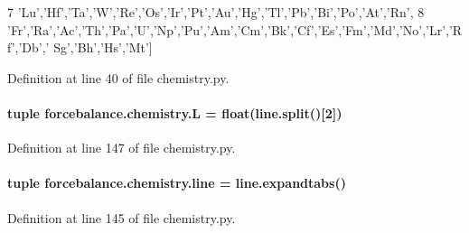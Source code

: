 \begin{DoxyCode}
7             \textcolor{stringliteral}{'Lu'},\textcolor{stringliteral}{'Hf'},\textcolor{stringliteral}{'Ta'},\textcolor{stringliteral}{'W'},\textcolor{stringliteral}{'Re'},\textcolor{stringliteral}{'Os'},\textcolor{stringliteral}{'Ir'},\textcolor{stringliteral}{'Pt'},\textcolor{stringliteral}{'Au'},\textcolor{stringliteral}{'Hg'},\textcolor{stringliteral}{'Tl'},\textcolor{stringliteral}{'Pb'},\textcolor{stringliteral}{'Bi'},\textcolor{stringliteral}{'Po'},\textcolor{stringliteral}{'At'},\textcolor{stringliteral}{'Rn'},
8             \textcolor{stringliteral}{'Fr'},\textcolor{stringliteral}{'Ra'},\textcolor{stringliteral}{'Ac'},\textcolor{stringliteral}{'Th'},\textcolor{stringliteral}{'Pa'},\textcolor{stringliteral}{'}\textcolor{stringliteral}{U','}Np','Pu','Am','Cm','Bk','Cf','Es','Fm','Md','No','Lr','Rf','Db','
      Sg','Bh','Hs','Mt']
\end{DoxyCode}


Definition at line 40 of file chemistry.\-py.

\hypertarget{namespaceforcebalance_1_1chemistry_ad5838ecc45d68a3a29f0c2518ceaaca2}{
\paragraph[{L}]{\setlength{\rightskip}{0pt plus 5cm}tuple forcebalance.\-chemistry.\-L = float(line.\-split()\mbox{[}2\mbox{]})}}\label{namespaceforcebalance_1_1chemistry_ad5838ecc45d68a3a29f0c2518ceaaca2}


Definition at line 147 of file chemistry.\-py.

\hypertarget{namespaceforcebalance_1_1chemistry_a5a3b715a402d39a5da6ae558e400ce85}{
\paragraph[{line}]{\setlength{\rightskip}{0pt plus 5cm}tuple forcebalance.\-chemistry.\-line = line.\-expandtabs()}}\label{namespaceforcebalance_1_1chemistry_a5a3b715a402d39a5da6ae558e400ce85}


Definition at line 145 of file chemistry.\-py.

